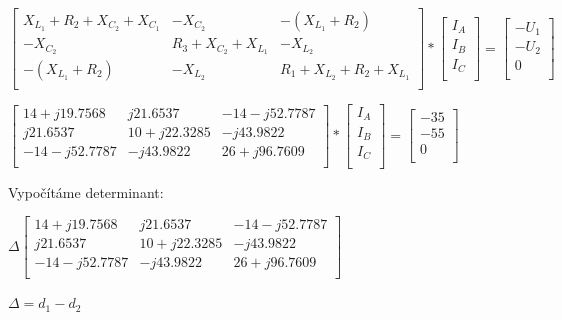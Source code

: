 \documentclass[12pt]{article}
\begin{document}
\begin{center}
\normalsize
$\begin{bmatrix}
X_{L_1}+R_2+X_{C_2}+X_{C_1} & -X_{C_2} & -(X_{L_1}+R_2)\\
-X_{C_2} & R_3+X_{C_2}+X_{L_1} & -X_{L_2}\\
-(X_{L_1}+R_2) & -X_{L_2} & R_1+X_{L_2}+R_2+X_{L_1}\\
\end{bmatrix}
*
\begin{bmatrix}
I_A\\
I_B\\
I_C\\
\end{bmatrix}
=
\begin{bmatrix}
-U_1\\
-U_2\\
0\\
\end{bmatrix}$
\vspace{15px}

\normalsize
$\begin{bmatrix}
14+j19.7568 & j21.6537 & -14-j52.7787\\
j21.6537 & 10+j22.3285 & -j43.9822\\
-14-j52.7787 & -j43.9822 & 26+j96.7609\\
\end{bmatrix}
*
\begin{bmatrix}
I_A\\
I_B\\
I_C\\
\end{bmatrix}
=
\begin{bmatrix}
-35\\
-55\\
0\\
\end{bmatrix}$
\vspace{15px}

\normalsize
Vypočítáme determinant:
\vspace{10px}

$\Delta\begin{bmatrix}
14+j19.7568 & j21.6537 & -14-j52.7787\\
j21.6537 & 10+j22.3285 & -j43.9822\\
-14-j52.7787 & -j43.9822 & 26+j96.7609\\
\end{bmatrix}$
\vspace{10px}

$\Delta=d_1-d_2$\\
\vspace{10px}


\end{center}
\end{document}
